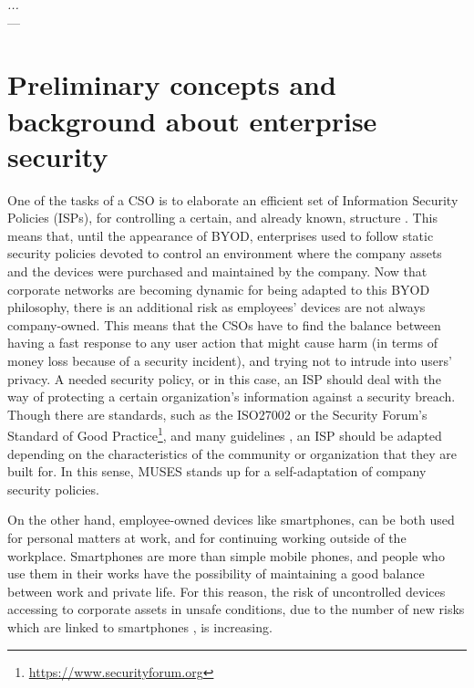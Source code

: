 \label{chap:byodSotA} 

\begin{flushright}{\slshape
   ... } \\ \medskip
    --- {}
\end{flushright}

\minitoc\mtcskip
\vfill

\section{Preliminary concepts and background about enterprise security}
\label{sec:preliminaryconcepts}

One of the tasks of a CSO is to elaborate an efficient set of Information Security Policies (ISPs), for controlling a certain, and already known, structure \cite{Opp_Security11}. This means that, until the appearance of BYOD, enterprises used to follow static security policies devoted to control an environment where the company assets and the devices were purchased and maintained by the company. Now that corporate networks are becoming dynamic for being adapted to this BYOD philosophy, there is an additional risk as employees' devices are not always company-owned. This means that the CSOs have to find the balance between having a fast response to any user action that might cause harm (in terms of money loss because of a security incident), and trying not to intrude into users' privacy. %
A needed security policy, or in this case, an ISP should deal with the way of protecting a certain organization's information against a security breach. Though there are standards, such as the ISO27002 or the Security Forum's Standard of Good Practice\footnote{\url{https://www.securityforum.org}}, and many guidelines \cite{SecPol09}, an ISP should be adapted depending on the characteristics of the community or organization that they are built for. In this sense, MUSES stands up for a self-adaptation of company security policies.

On the other hand, employee-owned devices like smartphones, can be both used for personal matters at work, and for continuing working outside of the workplace. Smartphones are more than simple mobile phones, and people who use them in their works have the possibility of maintaining a good balance between work and private life. For this reason, the risk of uncontrolled devices accessing to corporate assets in unsafe conditions, due to the number of new risks which are linked to smartphones \cite{gangula2013survey}, is increasing.

